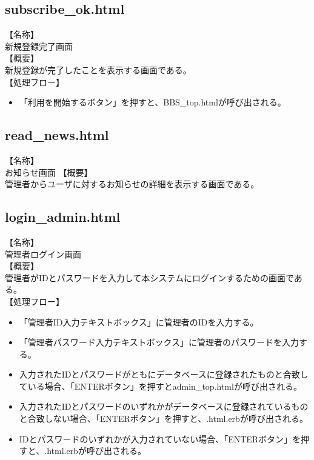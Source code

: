 \documentclass[a4j]{jarticle}
\begin{document}
\subsection{subscribe\_ok.html}
【名称】\\
新規登録完了画面\\
【概要】\\
新規登録が完了したことを表示する画面である。\\
【処理フロー】\\
\begin{itemize}
  \item 「利用を開始するボタン」を押すと、BBS\_top.htmlが呼び出される。
\end{itemize}


\subsection{read\_news.html}
【名称】\\
お知らせ画面
【概要】\\
管理者からユーザに対するお知らせの詳細を表示する画面である。\\

\subsection{login\_admin.html}
【名称】\\
管理者ログイン画面\\
【概要】\\
管理者がIDとパスワードを入力して本システムにログインするための画面である。\\
【処理フロー】\\
\begin{itemize}
  \item 「管理者ID入力テキストボックス」に管理者のIDを入力する。
  \item 「管理者パスワード入力テキストボックス」に管理者のパスワードを入力する。
  \item 入力されたIDとパスワードがともにデータベースに登録されたものと合致している場合、「ENTERボタン」を押すとadmin\_top.htmlが呼び出される。
  \item 入力されたIDとパスワードのいずれかがデータベースに登録されているものと合致しない場合、「ENTERボタン」を押すと、.html.erbが呼び出される。
  \item IDとパスワードのいずれかが入力されていない場合、「ENTERボタン」を押すと、.html.erbが呼び出される。
\end{itemize}
\end{document}

